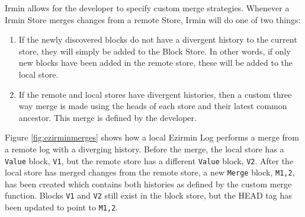 \documentclass[12pt,a4paper,twoside,openright]{report}
\begin{document}
	Irmin allows for the developer to specify custom merge strategies. 
	Whenever a Irmin Store merges changes from a remote Store, Irmin will do one of two things:
	\begin{enumerate}
		\item If the newly discovered blocks do not have a divergent history to the current store, they will simply be added to the Block Store. 
			In other words, if only new blocks have been added in the remote store, these will be added to the local store. 
		\item If the remote and local stores have divergent histories, then a custom three way merge is made using the heads of each store and their latest common ancestor.
			This merge is defined by the developer.
	\end{enumerate}
	Figure \ref{fig:ezirminmerges} shows how a local Ezirmin Log performs a merge from a remote log with a diverging history.
	Before the merge, the local store has a \texttt{Value} block, \texttt{V1}, but the remote store has a different \texttt{Value} block, \texttt{V2}.
	After the local store has merged changes from the remote store, a new \texttt{Merge} block, \texttt{M1,2}, has been created which contains both histories as defined by the custom merge function. 
	Blocks \texttt{V1} and \texttt{V2} still exist in the block store, but the HEAD tag has been updated to point to \texttt{M1,2}.
\end{document}
